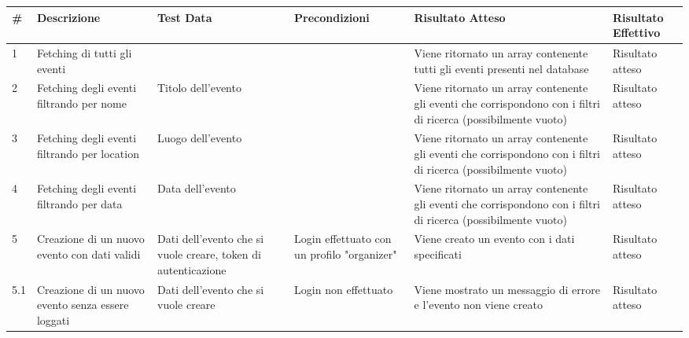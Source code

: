 \documentclass[9pt]{extarticle}
\begin{document}
\begin{table}[!htb]
	\centering
	\renewcommand{\arraystretch}{1.7} %
	\setlength{\tabcolsep}{6pt} %
	\resizebox{\textwidth}{!}
	{%
	\begin{tabular}{p{.4cm} p{3.5cm} p{2.5cm} p{2.5cm} p{5cm} p{1.5cm}}
		\toprule
		\rowcolor{gray!20}
		\# & Descrizione & Test Data & Precondizioni & Risultato Atteso & Risultato Effettivo \\ \midrule
		1 & Fetching di tutti gli eventi                                                 &                                                               &                                             & Viene ritornato un array contenente tutti gli eventi presenti nel database                                     & Risultato atteso      \\\midrule
		2 & Fetching degli eventi filtrando per nome                                     & Titolo dell'evento                                            &                                             & Viene ritornato un array contenente gli eventi che corrispondono con i filtri di ricerca (possibilmente vuoto) & Risultato atteso      \\\midrule
		3 & Fetching degli eventi filtrando per location                                 & Luogo dell'evento                                             &                                             & Viene ritornato un array contenente gli eventi che corrispondono con i filtri di ricerca (possibilmente vuoto) & Risultato atteso      \\\midrule
		4 & Fetching degli eventi filtrando per data                                     & Data dell'evento                                              &                                             & Viene ritornato un array contenente gli eventi che corrispondono con i filtri di ricerca (possibilmente vuoto) & Risultato atteso      \\\midrule
		5 & Creazione di un nuovo evento con dati validi                                 & Dati dell'evento che si vuole creare, token di autenticazione & Login effettuato con un profilo "organizer" & Viene creato un evento con i dati specificati                                                                  & Risultato atteso      \\\midrule
		5.1 & Creazione di un nuovo evento senza essere loggati                            & Dati dell'evento che si vuole creare                          & Login non effettuato                        & Viene mostrato un messaggio di errore e l'evento non viene creato                                              & Risultato atteso      \\\midrule

\end{tabular}}
\end{table}
\end{document}
